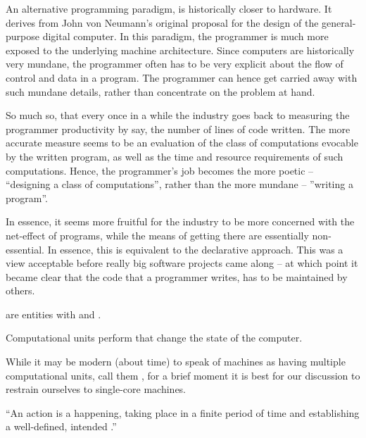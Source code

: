 An alternative programming paradigm, is historically closer to hardware. It
derives from John von Neumann's original proposal for the design of the
general-purpose digital computer\cite{von-neumann}. In this paradigm, the
programmer is much more exposed to the underlying machine architecture. Since
computers are historically very mundane, the programmer often has to be very
explicit about the flow of control and data in a program. The programmer can
hence get carried away with such mundane details, rather than concentrate on
the problem at hand.

So much so, that every once in a while the industry goes back to measuring the
programmer productivity by say, the number of lines of code written. The more
accurate measure seems to be an evaluation of the class of computations
evocable by the written program, as well as the time and resource requirements
of such computations. Hence, the programmer's job becomes the more poetic --
``designing a class of computations'', rather than the more mundane --
''writing a program''.

In essence, it seems more fruitful for the industry to be more concerned with
the net-effect of programs, while the means of getting there are essentially
non-essential. In essence, this is equivalent to the declarative approach. This
was a view acceptable before really big software projects came along -- at
which point it became clear that the code that a programmer writes, has to be
maintained by others.

\begin{definition}

 are entities with  and .

\end{definition}

\begin{definition}

Computational units perform  that change the state of the computer.

\end{definition}

While it may be modern (about time) to speak of machines as having multiple
computational units, call them , for a brief moment it is best for
our discussion to restrain ourselves to single-core machines.

\begin{definition}

``An action is a happening, taking place in a finite period of time and
establishing a well-defined, intended .''
\cite{dijkstra-introduction}

\end{definition}

